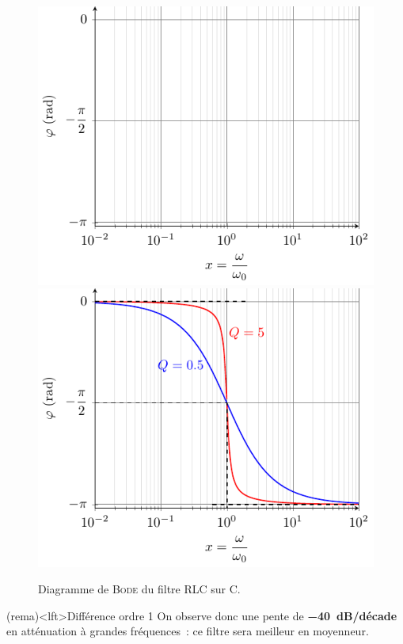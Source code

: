 \documentclass[../../main/main.tex]{subfiles}
\begin{document}
\begin{figure}[htbp!]
{{			\includegraphics[width=.95\linewidth]{RLCC_bode-phase_plain}
		}{%
			\includegraphics[width=.95\linewidth]{RLCC_bode-phase}
		}%
	}%
	\caption{Diagramme de \textsc{Bode} du filtre RLC sur C.}
	\label{fig:rlcbode}
\end{figure}

\vspace{-25pt}
\begin{tcb}(rema)<lft>{Différence ordre 1}
	On observe donc une pente de \textbf{\SI{-40}{dB/décade}} en atténuation à
	grandes fréquences~: ce filtre sera meilleur en moyenneur.
\end{tcb}
\end{document}

